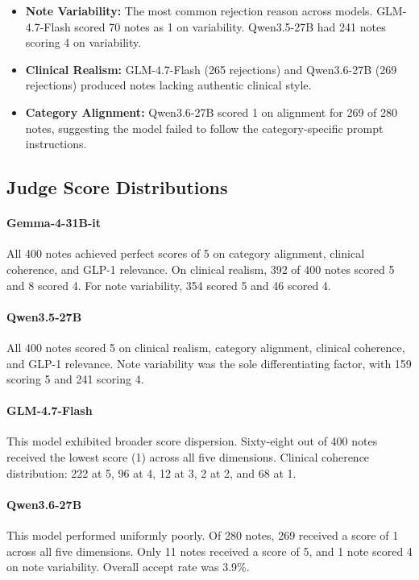 \documentclass[11pt, a4paper]{article}
\begin{document}
\begin{itemize}
    \item \textbf{Note Variability:} The most common rejection reason across models. GLM-4.7-Flash scored 70 notes as 1 on variability. Qwen3.5-27B had 241 notes scoring 4 on variability.
    \item \textbf{Clinical Realism:} GLM-4.7-Flash (265 rejections) and Qwen3.6-27B (269 rejections) produced notes lacking authentic clinical style.
    \item \textbf{Category Alignment:} Qwen3.6-27B scored 1 on alignment for 269 of 280 notes, suggesting the model failed to follow the category-specific prompt instructions.
\end{itemize}

\subsection{Judge Score Distributions}

\paragraph{Gemma-4-31B-it}
All 400 notes achieved perfect scores of 5 on category alignment, clinical coherence, and GLP-1 relevance. On clinical realism, 392 of 400 notes scored 5 and 8 scored 4. For note variability, 354 scored 5 and 46 scored 4.

\paragraph{Qwen3.5-27B}
All 400 notes scored 5 on clinical realism, category alignment, clinical coherence, and GLP-1 relevance. Note variability was the sole differentiating factor, with 159 scoring 5 and 241 scoring 4.

\paragraph{GLM-4.7-Flash}
This model exhibited broader score dispersion. Sixty-eight out of 400 notes received the lowest score (1) across all five dimensions. Clinical coherence distribution: 222 at 5, 96 at 4, 12 at 3, 2 at 2, and 68 at 1.

\paragraph{Qwen3.6-27B}
This model performed uniformly poorly. Of 280 notes, 269 received a score of 1 across all five dimensions. Only 11 notes received a score of 5, and 1 note scored 4 on note variability. Overall accept rate was 3.9\%.
\end{document}
